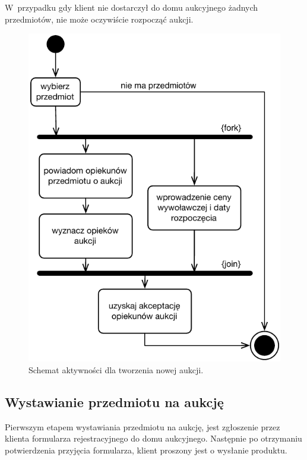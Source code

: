 \documentclass[10pt,a4paper]{article}
\begin{document}
W~przypadku gdy klient nie dostarczył do domu aukcyjnego żadnych przedmiotów,
nie może oczywiście rozpocząć aukcji.

\vspace{40pt}
\begin{figure}[hb]
  \begin{adjustwidth}{-3cm}{-3cm}
    \centering
    \includegraphics{figury/aktywnosc-nowa-aukcja}
    \caption{Schemat aktywności dla tworzenia nowej aukcji.}
    \label{fig:aktywnosc_nowa_aukcja}
  \end{adjustwidth}
\end{figure}
\clearpage

\subsection{Wystawianie przedmiotu na aukcję}

Pierwszym etapem wystawiania przedmiotu na aukcję, jest zgłoszenie przez
klienta formularza rejestracyjnego do domu aukcyjnego. Następnie po otrzymaniu
potwierdzenia przyjęcia formularza, klient proszony jest o wysłanie produktu.
\end{document}
